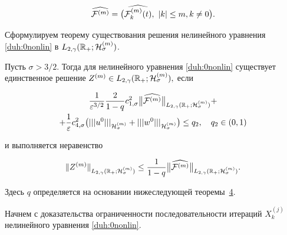 $$\widehat{{\cal F}^{(m)}}=\bigl(\widehat{{\cal F}^{(m)}_k(t)},~|k|\le m, k\ne0\bigr).

$$

Сформулируем теорему существования решения нелинейного уравнения \eqref{duh:0nonlin} в $L_{2,\gamma}(\mathbb R_{+};{\cal H}^{(m)}_\sigma)$.



\smallskip



\begin{theorem}[3]Пусть $\sigma>3/2.$ Тогда для нелинейного уравнения \eqref{duh:0nonlin} существует единственное решение $Z^{(m)}\in L_{2,\gamma}(\mathbb R_{+};{\cal H}^{(m)}_\sigma),$ если

\begin{multline}

\frac{1}{\varepsilon^{3/2}}\frac{2}{1-q}c^2_{1,\sigma}

\bigl\|\widehat{{\cal F}^{(m)} } \bigr\|_{L_{2,\gamma}(\mathbb R_{+};{\cal H}^{(m)}_{\sigma})}+

\\

+\frac{1}{\varepsilon}c^2_{4,\sigma}\bigl(|||u^0|||_{{\cal H}^{(m)}_\sigma}+|||w^0|||_{{\cal H}^{(m)}_\sigma}\bigr)\le q_2,\quad  q_2\in(0, 1)

\end{multline}

и выполняется неравенство

$$

\|Z^{(m)}\|_{L_{2,\gamma}(\mathbb R_{+};{\cal H}^{(m)}_{\sigma})} \le \frac{1}{1-q}\bigl\| \widehat{{\cal F}^{(m)}} \bigr\|_{L_{2,\gamma}(\mathbb R_{+};{\cal H}^{(m)}_{\sigma})}.

$$

\end{theorem}



\smallskip

Здесь $q$ определяется  на основании нижеследующей теоремы~\hyperlink{dukh:th:4}{4}. 



\smallskip



 Начнем с доказательства ограниченности последовательности итераций $X^{(j)}_k$ нелинейного уравнения \eqref{duh:0nonlin}.



\smallskip

\hypertarget{dukh:th:4}{}



